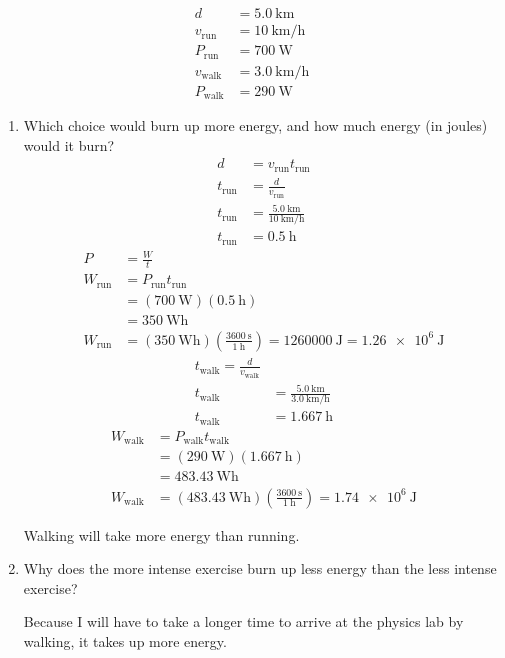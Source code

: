 \documentclass{article}
\begin{document}
\begin{align*}
	d & = \SI{5.0}{\kilo \meter} \\
	v_\text{run} & = \SI{10}{\kilo \meter \per \hour} \\
	P_\text{run} & = \SI{700}{\watt} \\
	v_\text{walk} & = \SI{3.0}{\kilo \meter \per \hour} \\
	P_\text{walk} & = \SI{290}{\watt}
\end{align*}
\begin{enumerate}[label = \textbf{\arabic*)}]
	\item Which choice would burn up more energy, and how much energy (in joules) would it burn?
		\begin{align*}
			d & = v_\text{run}t_\text{run} \\
			t_\text{run} & = \frac{d}{v_\text{run}} \\
			t_\text{run} & = \frac{\SI{5.0}{\kilo \meter}}{\SI{10}{\kilo \meter \per \hour}} \\
			t_\text{run} & = \SI{0.5}{\hour}
		\end{align*}
		\begin{align*}
			P & = \frac{W}{t} \\
			W_\text{run} & = P_\text{run}t_\text{run} \\
						 & = (\SI{700}{\watt})(\SI{0.5}{\hour}) \\
						 & = \SI{350}{\watt \hour} \\
			W_\text{run} & = (\SI{350}{\watt \hour}) \left( \frac{\SI{3600}{\second}}{\SI{1}{\hour}} \right) = \SI{1260000}{\joule} = \SI{1.26e6}{\joule}
		\end{align*}
		\begin{align*}
			t_\text{walk} = \frac{d}{v_\text{walk}} \\
			t_\text{walk} & = \frac{\SI{5.0}{\kilo \meter}}{\SI{3.0}{\kilo \meter \per \hour}} \\
			t_\text{walk} & = \SI{1.667}{\hour}
		\end{align*}
		\begin{align*}
			W_\text{walk} & = P_\text{walk}t_\text{walk} \\
						  & = (\SI{290}{\watt})(\SI{1.667}{\hour}) \\
						  & = \SI{483.43}{\watt \hour} \\
			W_\text{walk} & = (\SI{483.43}{\watt \hour}) \left( \frac{\SI{3600}{\second}}{\SI{1}{\hour}} \right) = \SI{1.74e6}{\joule}
		\end{align*}
		\begin{mdframed}
			Walking will take more energy than running.
		\end{mdframed}
	\item Why does the more intense exercise burn up less energy than the less intense exercise?
		\begin{mdframed}
			Because I will have to take a longer time to arrive at the physics lab by walking, it takes up more energy.
		\end{mdframed}
\end{enumerate}
\end{document}
